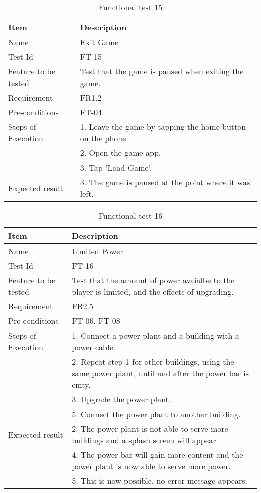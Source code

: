 \begin{table}[H]
\centering
	\begin{tabular}{ l | p{8cm} }
		\hline
		{\bf Item} & {\bf Description} \\ \hline
		Name & Exit Game \\ 
		Test Id & FT-15 \\ 
		Feature to be tested & Test that the game is paused when exiting the game. \\ 
		Requirement & FR1.2 \\ 
		Pre-conditions & FT-04. \\ 
		Steps of Execution & 1. Leave the game by tapping the home button on the phone. \\
		& 2. Open the game app. \\
		& 3. Tap 'Load Game'. \\
		Expected result & 3. The game is paused at the point where it was left. \\  
	\end{tabular}
	\caption{Functional test 15}
\end{table}

\begin{table}[H]
\centering
	\begin{tabular}{ l | p{8cm} }
		\hline
		{\bf Item} & {\bf Description} \\ \hline
		Name & Limited Power \\ 
		Test Id & FT-16 \\ 
		Feature to be tested & Test that the amount of power avaialbe to the player is limited, and the effects of upgrading. \\ 
		Requirement & FR2.5 \\ 
		Pre-conditions & FT-06, FT-08\\ 
		Steps of Execution & 1. Connect a power plant and a building with a power cable. \\
		& 2. Repeat step 1 for other buildings, using the same power plant, until and after the power bar is emty. \\
		& 3. Upgrade the power plant. \\
		& 5. Connect the power plant to another building. \\
		Expected result & 2. The power plant is not able to serve more buildings and a splash screen will appear. \\ 
		& 4. The power bar will gain more content and the power plant is now able to serve more power. \\
		& 5. This is now possible, no error message appears. \\
	\end{tabular}
	\caption{Functional test 16}
\end{table}

